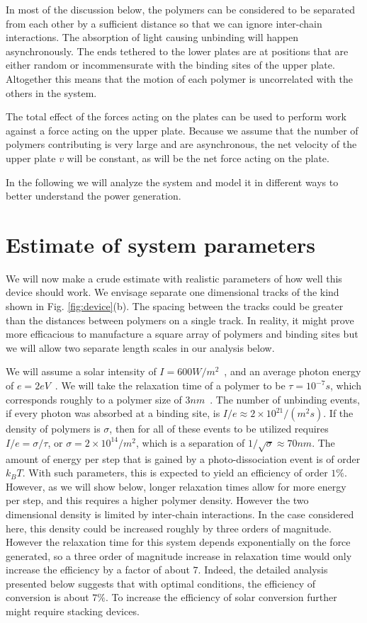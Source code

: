 \documentclass[journal = mamobx, manuscript = article]{achemso}
\begin{document}
In most of the discussion below, the polymers can be considered to be separated
from each other by a sufficient distance so that we can ignore inter-chain interactions.
The absorption of light causing unbinding will happen asynchronously. The ends
tethered to the lower plates are at positions that are either random or
incommensurate with the binding sites of the upper plate. Altogether this means that
the motion of each polymer is uncorrelated with the others in the system.

The total effect of the forces acting on the plates can be used to perform
work against a force acting on the upper plate. Because we assume that
the number of polymers contributing is very large and are asynchronous, the net velocity of the
upper plate $v$ will be constant, as will be the net force acting on the plate.

In the following we will analyze the system and model it in different ways to 
better understand the power generation.


\section{Estimate of system parameters}
\label{sec:EOSP}

We will now make a crude estimate with realistic parameters of how well this device should work.
We envisage separate one dimensional tracks of the kind shown in Fig.
\ref{fig:device}(b). The spacing between the tracks could be greater than the
distances between polymers on a single track.  In reality, it might prove
more efficacious to manufacture a square array of polymers and binding sites
but we will allow two separate length scales in our analysis below.

We will assume a solar intensity of $I = 600 W/m^2$~\cite{SunLiu}, and an average photon energy of  $e = 2eV$~\cite{Gates}. We
will take the relaxation
time of a polymer to be $\tau = 10^{-7}s$, which corresponds roughly to a polymer size of $3nm$~\cite{degennes}.
The number of unbinding events, if every photon was
absorbed at a binding site, is $I/e \approx 2\times 10^{21}/(m^2 s)$. If the density of polymers is
$\sigma$, then for all of these events to be utilized requires $I/e = \sigma/\tau$, or
$\sigma = 2\times 10^{14}/m^2$, which is a separation of $1/\sqrt{\sigma} \approx 70 nm$.
The amount of energy per step that is gained by a photo-dissociation event is of
order $k_B T$. With such parameters, this is expected to yield an efficiency of
order $1\%$. However, as we will show below, longer relaxation times allow 
for more energy per step, and this requires a higher polymer density. However
the two dimensional density is limited by inter-chain interactions. In the case
considered here, this density could be increased roughly by three orders of
magnitude. However the
relaxation time for this system depends exponentially on the force generated, so 
a three order of magnitude increase in relaxation time
would only increase the efficiency by a factor of about $7$. Indeed, the
detailed analysis presented below suggests that with optimal conditions, the
efficiency of conversion is about $7\%$.
To increase the efficiency of solar conversion further might require stacking devices.
\end{document}
